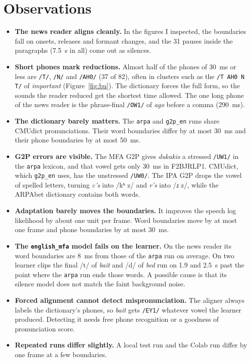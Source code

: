 \documentclass[11pt,a4paper]{article}
\newcommand{\code}[1]{\texttt{#1}}
\newcommand{\ph}[1]{\texttt{/#1/}}
\newcommand{\ipa}[1]{{\ipafont /#1/}}
\begin{document}
\section{Observations}
\begin{itemize}
\item \textbf{The news reader aligns cleanly.} In the figures I inspected, the boundaries fall on onsets, releases and
  formant changes, and the 31 pauses inside the paragraphs (7.5~s in all) come out as silences.
\item \textbf{Short phones mark reductions.} Almost half of the phones of 30~ms or less are \ph{T}, \ph{N} and
  \ph{AH0} (37 of 82), often in clusters such as the \ph{T AH0 N T} of \textit{important} (Figure~\ref{fig:bu}). The
  dictionary forces the full form, so the sounds the reader reduced get the shortest time allowed. The one long phone of
  the news reader is the phrase-final \ph{OW1} of \textit{ago} before a comma (290~ms).
\item \textbf{The dictionary barely matters.} The \code{arpa} and \code{g2p\_en} runs share CMUdict pronunciations.
  Their word boundaries differ by at most 30~ms and their phone boundaries by at most 50~ms.
\item \textbf{G2P errors are visible.} The MFA G2P gives \textit{dukakis} a stressed \ph{UW1} in the \code{arpa}
  lexicon, and that vowel gets only 30~ms in F2BJRLP1. CMUdict, which \code{g2p\_en} uses, has the unstressed
  \ph{UW0}. The IPA G2P drops the vowel of spelled letters, turning \textit{c's} into \ipa{kʰ z} and \textit{r's} into
  \ipa{ɹ z}, while the ARPAbet dictionary contains both words.
\item \textbf{Adaptation barely moves the boundaries.} It improves the speech log likelihood by about one unit per frame. Word
  boundaries move by at most one frame and phone boundaries by at most 30~ms.
\item \textbf{The \code{english\_mfa} model fails on the learner.} On the news reader its word boundaries are 8~ms from
  those of the \code{arpa} run on average. On two learner clips the final \ipa{t} of \textit{bait} and \ipa{d} of
  \textit{bed} run on 1.9 and 2.5~s past the point where the \code{arpa} run ends those words. A possible cause is that
  its silence model does not match the faint background noise.
\item \textbf{Forced alignment cannot detect mispronunciation.} The aligner always labels the dictionary's phones, so
  \textit{bait} gets \ph{EY1} whatever vowel the learner produced. Detecting it needs free phone recognition or a
  goodness of pronunciation score.
\item \textbf{Repeated runs differ slightly.} A local test run and the Colab run differ by one frame at a few
  boundaries.
\end{itemize}
\end{document}
